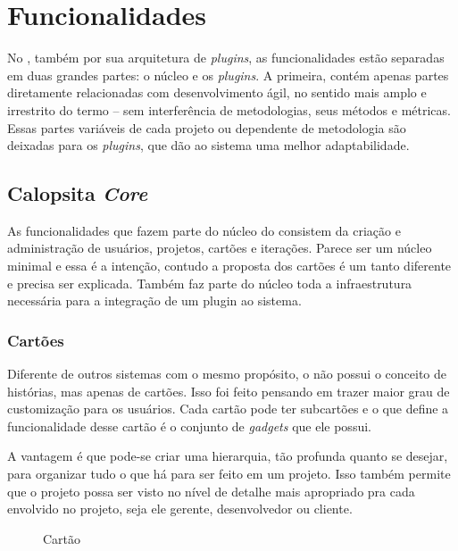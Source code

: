 \section{Funcionalidades}

No \calopsita{}, também por sua arquitetura de \textit{plugins}, as funcionalidades estão separadas em duas grandes partes: o núcleo e os \textit{plugins}. A primeira, contém apenas partes diretamente relacionadas com desenvolvimento ágil, no sentido mais amplo e irrestrito do termo -- sem interferência de metodologias, seus métodos e métricas. Essas partes variáveis de cada projeto ou dependente de metodologia são deixadas para os \textit{plugins}, que dão ao sistema uma melhor adaptabilidade.

\subsection{Calopsita \textit{Core}}

As funcionalidades que fazem parte do núcleo do \calopsita{} consistem da criação e administração de usuários, projetos, cartões e iterações. Parece ser um núcleo minimal e essa é a intenção, contudo a proposta dos cartões é um tanto diferente e precisa ser explicada. Também faz parte do núcleo toda a infraestrutura necessária para a integração de um plugin ao sistema.

\subsubsection*{Cartões}

Diferente de outros sistemas com o mesmo propósito, o \calopsita{} não possui o conceito de histórias, mas apenas de cartões. Isso foi feito pensando em trazer maior grau de customização para os usuários. Cada cartão pode ter subcartões e o que define a funcionalidade desse cartão é o conjunto de \textit{gadgets} que ele possui. 

A vantagem é que pode-se criar uma hierarquia, tão profunda quanto se desejar, para organizar tudo o que há para ser feito em um projeto. Isso também permite que o projeto possa ser visto no nível de detalhe mais apropriado pra cada envolvido no projeto, seja ele gerente, desenvolvedor ou cliente. 

\begin{figure}[H]
  \centering
  \caption{Cartão}\label{figura:cartao}
\end{figure}

